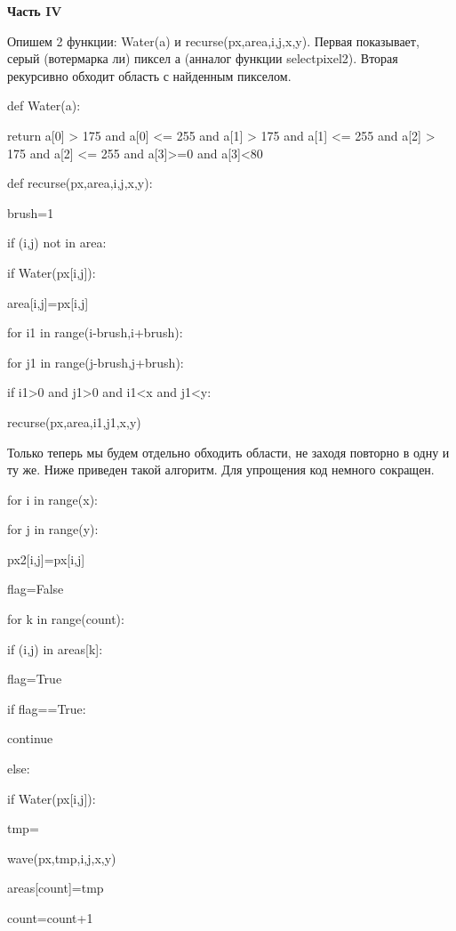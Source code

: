 \documentclass{article}
\newcommand\tab[1][1cm]{\hspace*{#1}}
\begin{document}
  \newpage
\begin{center}
{\large\bf Часть IV}
\end{center}
 
Опишем 2 функции: Water(a) и recurse(px,area,i,j,x,y). Первая показывает, серый (вотермарка ли) пиксел а (анналог функции select\textunderscore pixel2). Вторая рекурсивно обходит область с найденным пикселом.
  
 { 
def Water(a):

\tab[1cm]	return a[0] > 175 and a[0] <= 255 and a[1] > 175 and a[1] <= 255 and a[2] > 175 and a[2] <= 255 and a[3]>=0 and a[3]<80
	
def recurse(px,area,i,j,x,y):

\tab[1cm]	brush=1

\tab[1cm]	if (i,j) not in area:

\tab[2cm]		if Water(px[i,j]):

\tab[3cm]			area[i,j]=px[i,j]

\tab[3cm]			for i1 in range(i-brush,i+brush):

\tab[4cm]				for j1 in range(j-brush,j+brush):

\tab[4cm]					if i1>0 and j1>0 and i1<x and j1<y:

\tab[5cm]						recurse(px,area,i1,j1,x,y)

						}
						  
Только теперь мы будем отдельно обходить области, не заходя повторно в одну и ту же. Ниже приведен такой алгоритм. Для упрощения код немного сокращен.

 { 

for i in range(x):

\tab[1cm]	for j in range(y):
		
\tab[2cm]		px2[i,j]=px[i,j]

\tab[2cm]		flag=False

\tab[2cm]		for k in range(count):

\tab[3cm]			if (i,j) in areas[k]:

\tab[4cm]				flag=True

\tab[2cm]		if flag==True:

\tab[3cm]			continue

\tab[2cm]		else:

\tab[3cm]			if Water(px[i,j]):

\tab[4cm]				tmp={}

\tab[4cm]				wave(px,tmp,i,j,x,y)

\tab[4cm]				areas[count]=tmp

\tab[4cm]				count=count+1
 
 
 } 
\end{document}
